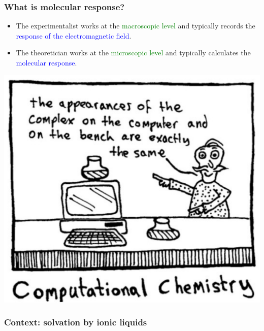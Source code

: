 \documentclass[xcolor=usenames,dvipsnames,svgnames]{beamer}
\begin{document}
\begin{frame}
  \frametitle{What is molecular response?}
  \begin{itemize}
  \item The experimentalist works at the \textcolor{Green}{macroscopic level} and typically records the \textcolor{blue}{response of the electromagnetic field}.
  \item The theoretician works at the \textcolor{Green}{microscopic level} and typically calculates the \textcolor{blue}{molecular response}.
  \end{itemize}
  \centering
  \includegraphics[scale=0.25]{./figures/computational_chemistry.pdf}
\end{frame}

\begin{frame}
  \frametitle{Context:  solvation by ionic liquids}
\end{frame}
\end{document}
